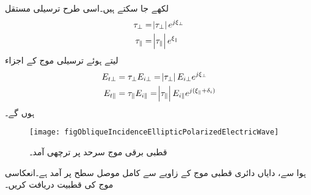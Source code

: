  لکھے جا سکتے ہیں۔اسی طرح  ترسیلی مستقل
\begin{align}
\tau_{\perp}&=\abs{\tau_{\perp}}e^{j\xi_{\perp}}\\
\tau_{\parallel}&=\abs{\tau_{\parallel}}e^{\xi_{\parallel}}
\end{align}
لیتے ہوئے ترسیلی موج کے  اجزاء
\begin{align}
E_{t\perp}&=\tau_{\perp} E_{i\perp}=\abs{\tau_{\perp}} E_{i\perp}e^{j\xi_{\perp}}\\
E_{t\parallel}&=\tau_{\parallel} E_{i\parallel}=\abs{\tau_{\parallel}} E_{i\parallel}e^{j(\xi_{\parallel}+\delta_i)}
\end{align}
ہوں گے۔
\begin{figure}
\centering
\texttt{[image: figObliqueIncidenceEllipticPolarizedElectricWave]}
\caption{قطبی برقی موج سرحد پر ترچھی آمد۔}
\label{شکل_قطبی_بیضوی_قطبی_ترچھی_آمد}
\end{figure}
ہوا سے،  دایاں دائری قطبی موج  کے زاویے سے  کامل موصل سطح پر آمد ہے۔انعکاسی موج کی قطبیت دریافت کریں۔

